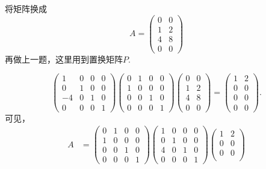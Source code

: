 ﻿\documentclass{book} \usepackage{exsheets} \usepackage{xeCJK}
\begin{document}
\begin{question}
  将矩阵换成
$$
A=
\begin{pmatrix}
  0&0\\
  1&2\\
  4&8\\
  0&0
\end{pmatrix}
$$
再做上一题，这里用到置换矩阵$P$.
\end{question}
\begin{solution}
  $$ 
  \begin{pmatrix}
    1&0&0&0\\
    0&1&0&0\\
    -4&0&1&0\\
    0&0&0&1
  \end{pmatrix}
  \begin{pmatrix}
    0&1&0&0\\
    1&0&0&0\\
    0&0&1&0\\
    0&0&0&1
  \end{pmatrix}
  \begin{pmatrix}
    0&0\\
    1&2\\
    4&8\\
    0&0
  \end{pmatrix}=
  \begin{pmatrix}
    1&2\\
    0&0\\
    0&0\\
    0&0
  \end{pmatrix}.
 $$
 可见，
 \begin{align*}
   A&=
      \begin{pmatrix}
        0&1&0&0\\
        1&0&0&0\\
        0&0&1&0\\
        0&0&0&1
      \end{pmatrix}
               \begin{pmatrix}
                 1&0&0&0\\
                 0&1&0&0\\
                 4&0&1&0\\
                 0&0&0&1
               \end{pmatrix}
                        \begin{pmatrix}
                          1&2\\
                          0&0\\
                          0&0\\

\end{pmatrix}
\end{align*}
\end{solution}
\end{document}
